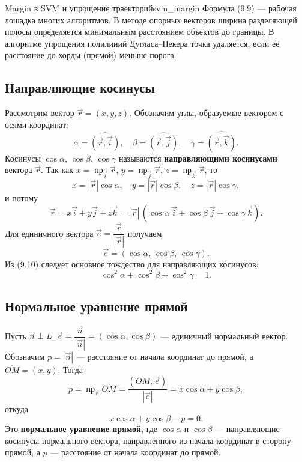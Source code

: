 \documentclass[12pt,a4paper]{article}
\begin{document}
\begin{remarkIT}{Margin в SVM и упрощение траекторий}{svm_margin}
  Формула (9.9) — рабочая лошадка многих алгоритмов. В методе опорных
  векторов ширина разделяющей полосы определяется минимальным расстоянием
  объектов до границы. В алгоритме упрощения полилиний Дугласа–Пекера
  точка удаляется, если её расстояние до хорды (прямой) меньше порога.
\end{remarkIT}

\subsection*{Направляющие косинусы}

Рассмотрим вектор $\vec{r} = (x, y, z)$. Обозначим углы, образуемые
вектором с осями координат:
\[
  \alpha = \widehat{(\vec{r}, \vec{i})}, \quad
  \beta = \widehat{(\vec{r}, \vec{j})}, \quad
  \gamma = \widehat{(\vec{r}, \vec{k})}.
\]
Косинусы $\cos\alpha$, $\cos\beta$, $\cos\gamma$ называются
\textbf{направляющими косинусами} вектора $\vec{r}$. Так как
$x = \operatorname{пр}_{\vec{i}} \vec{r}$,
$y = \operatorname{пр}_{\vec{j}} \vec{r}$,
$z = \operatorname{пр}_{\vec{k}} \vec{r}$, то
\[
  x = |\vec{r}|\cos\alpha, \quad y = |\vec{r}|\cos\beta, \quad
  z = |\vec{r}|\cos\gamma,
\]
и потому
\[
  \vec{r} = x\vec{i} + y\vec{j} + z\vec{k}
  = |\vec{r}|\,(\cos\alpha\,\vec{i} + \cos\beta\,\vec{j}
  + \cos\gamma\,\vec{k}).
\]
Для единичного вектора $\vec{e} = \dfrac{\vec{r}}{|\vec{r}|}$ получаем
\begin{equation}
  \vec{e} = (\cos\alpha,\, \cos\beta,\, \cos\gamma). \tag{9.10}
\end{equation}
Из (9.10) следует основное тождество для направляющих косинусов:
\[
  \cos^2\alpha + \cos^2\beta + \cos^2\gamma = 1.
\]

\subsection*{Нормальное уравнение прямой}

Пусть $\vec{n} \perp L$, $\vec{e} = \dfrac{\vec{n}}{|\vec{n}|}
= (\cos\alpha, \cos\beta)$ — единичный нормальный вектор. Обозначим
$p = |\vec{n}|$ — расстояние от начала координат до прямой, а
$\overline{OM} = (x, y)$. Тогда
\[
  p = \operatorname{пр}_{\vec{e}} \overline{OM}
  = \frac{(\overline{OM}, \vec{e})}{|\vec{e}|}
  = x\cos\alpha + y\cos\beta,
\]
откуда
\begin{equation}
  x\cos\alpha + y\cos\beta - p = 0. \tag{9.11}
\end{equation}
Это \textbf{нормальное уравнение прямой}, где $\cos\alpha$ и $\cos\beta$ —
направляющие косинусы нормального вектора, направленного из начала
координат в сторону прямой, а $p$ — расстояние от начала координат до
прямой.
\end{document}
